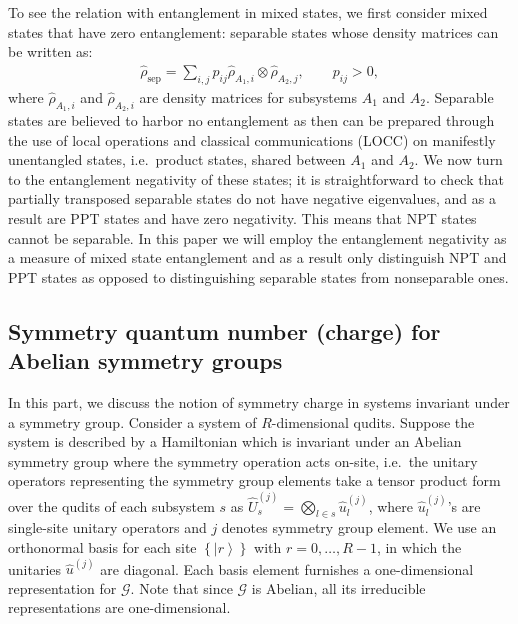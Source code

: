 \documentclass[aps,pra,reprint,superscriptaddress,twocolumn,notitlepage]{revtex4-1}
\numberwithin{equation}{section}
\begin{document}
To see the relation with entanglement in mixed states, we first consider mixed states that have zero entanglement: separable states whose density matrices can be written as:
\begin{align}
\label{eq:separable}
\hat\rho_{\text{sep}} = \sum_{i,j} p_{ij} \hat\rho_{A_1,i}\otimes \hat\rho_{A_2,j},
\qquad p_{ij}>0,
\end{align}
where $\hat\rho_{A_1,i}$ and $\hat\rho_{A_2,i}$ are density matrices for subsystems $A_1$ and $A_2$. Separable states are believed to harbor no entanglement as then can be prepared through the use of local operations and classical communications (LOCC) on manifestly unentangled states, i.e.~product states, shared between $A_1$ and $A_2$. We now turn to the entanglement negativity of these states; it is straightforward to check that partially transposed separable states do not have negative eigenvalues, and as a result are PPT states and have zero negativity. This means that NPT states cannot be separable. In this paper we will employ the entanglement negativity as a measure of mixed state entanglement and as a result only distinguish NPT and PPT states as opposed to distinguishing separable states from nonseparable ones.





\subsection{Symmetry quantum number (charge) for Abelian symmetry groups}




In this part, we discuss the notion of symmetry charge in systems invariant under a symmetry group. Consider a system of $R$-dimensional qudits. Suppose the system is described by a Hamiltonian which is invariant under an Abelian symmetry group where the symmetry operation acts on-site, i.e.~the unitary operators representing the symmetry group elements take a tensor product form over the qudits of each subsystem $s$ as $\hat U^{(j)}_{s} = \bigotimes_{l \in s} \hat u^{(j)}_l$, where $\hat u^{(j)}_l$'s are single-site unitary operators and $j$ denotes symmetry group element. We use an orthonormal basis for each site $\left\{ \left| r \right\rangle \right\}$ with $r=0,\ldots,R-1$, in which the unitaries $\hat u^{(j)}$ are diagonal. Each basis element furnishes a one-dimensional representation for $\mathcal{G}$. Note that since $\mathcal{G}$ is Abelian, all its irreducible representations are one-dimensional.
\end{document}
